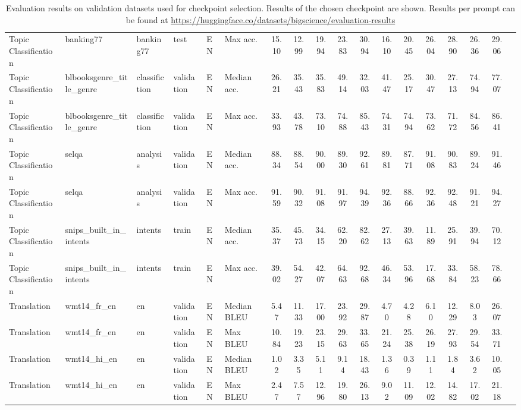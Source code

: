 \documentclass[11pt]{article}
\begin{document}
\begin{table*}[ht]
\begin{minipage}{\pdfpagewidth}
{\begin{tabular}{llllll|ccccc|ccccccc}
Topic Classification & banking77 & banking77 & test & EN & Max acc. & 15.10 & 12.99 & 19.94 & 23.83 & 30.94 & 16.10 & 20.45 & 26.04 & 28.90 & 26.36 & 29.06\\
Topic Classification & blbooksgenre\_title\_genre & classifiction & validation & EN & Median acc. & 26.21 & 35.43 & 35.83 & 49.14 & 32.03 & 41.47 & 25.17 & 30.47 & 27.13 & 74.94 & 77.07\\
Topic Classification & blbooksgenre\_title\_genre & classifiction & validation & EN & Max acc. & 33.93 & 43.78 & 73.10 & 74.88 & 85.43 & 74.31 & 74.94 & 73.62 & 71.72 & 84.56 & 86.41\\
Topic Classification & selqa & analysis & validation & EN & Median acc. & 88.34 & 88.54 & 90.00 & 89.30 & 92.61 & 89.81 & 87.71 & 91.08 & 90.83 & 89.24 & 91.46\\
Topic Classification & selqa & analysis & validation & EN & Max acc. & 91.59 & 90.32 & 91.08 & 91.97 & 94.39 & 92.36 & 88.66 & 92.36 & 92.48 & 91.21 & 94.27\\
Topic Classification & snips\_built\_in\_intents & intents & train & EN & Median acc. & 35.37 & 45.73 & 34.15 & 62.20 & 82.62 & 27.13 & 39.63 & 11.89 & 25.91 & 39.94 & 70.12\\
Topic Classification & snips\_built\_in\_intents & intents & train & EN & Max acc. & 39.02 & 54.27 & 42.07 & 64.63 & 92.68 & 46.34 & 53.96 & 17.68 & 33.84 & 58.23 & 78.66\\
\midrule
Translation & wmt14\_fr\_en & en & validation & EN & Median BLEU & 5.47 & 11.33 & 17.00 & 23.92 & 29.87 & 4.70 & 4.28 & 6.10 & 12.29 & 8.03 & 26.07\\
Translation & wmt14\_fr\_en & en & validation & EN & Max BLEU & 10.84 & 19.23 & 23.15 & 29.63 & 33.65 & 21.24 & 25.38 & 26.19 & 27.93 & 29.54 & 33.71\\
Translation & wmt14\_hi\_en & en & validation & EN & Median BLEU & 1.02 & 3.35 & 5.11 & 9.14 & 18.43 & 1.36 & 0.39 & 1.11 & 1.84 & 3.62 & 10.05\\
Translation & wmt14\_hi\_en & en & validation & EN & Max BLEU & 2.47 & 7.57 & 12.96 & 19.80 & 26.13 & 9.02 & 11.09 & 12.02 & 14.82 & 17.02 & 21.18\\
\midrule
\bottomrule
            \end{tabular}
            }
    \caption{Evaluation results on validation datasets used for checkpoint selection. Results of the chosen checkpoint are shown. Results per prompt can be found at \url{https://huggingface.co/datasets/bigscience/evaluation-results}
    \label{tab:valres}
    }
\end{minipage}
\end{table*} 
\clearpage
\eject \pdfpagewidth=21cm \pdfpageheight=29.7cm
\end{document}
